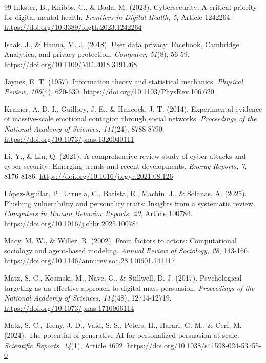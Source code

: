 \documentclass[11pt,a4paper]{article}
\newcommand{\doiurl}[1]{\href{https://doi.org/#1}{https://doi.org/#1}}
\begin{document}
\begin{thebibliography}{99}
Inkster, B., Knibbs, C., \& Bada, M. (2023). Cybersecurity: A critical priority for digital mental
health. \textit{Frontiers in Digital Health, 5}, Article 1242264.
\doiurl{10.3389/fdgth.2023.1242264}

Isaak, J., \& Hanna, M. J. (2018). User data privacy: Facebook, Cambridge Analytica, and privacy
protection. \textit{Computer, 51}(8), 56-59. \doiurl{10.1109/MC.2018.3191268}

Jaynes, E. T. (1957). Information theory and statistical mechanics. \textit{Physical Review,
106}(4), 620-630. \doiurl{10.1103/PhysRev.106.620}

Kramer, A. D. I., Guillory, J. E., \& Hancock, J. T. (2014). Experimental evidence of
massive-scale emotional contagion through social networks. \textit{Proceedings of the National
Academy of Sciences, 111}(24), 8788-8790. \doiurl{10.1073/pnas.1320040111}

Li, Y., \& Liu, Q. (2021). A comprehensive review study of cyber-attacks and cyber security:
Emerging trends and recent developments. \textit{Energy Reports, 7}, 8176-8186.
\doiurl{10.1016/j.egyr.2021.08.126}

L\'opez-Aguilar, P., Urruela, C., Batista, E., Machin, J., \& Solanas, A. (2025). Phishing
vulnerability and personality traits: Insights from a systematic review. \textit{Computers in Human
Behavior Reports, 20}, Article 100784. \doiurl{10.1016/j.chbr.2025.100784}

Macy, M. W., \& Willer, R. (2002). From factors to actors: Computational sociology and agent-based
modeling. \textit{Annual Review of Sociology, 28}, 143-166.
\doiurl{10.1146/annurev.soc.28.110601.141117}

Matz, S. C., Kosinski, M., Nave, G., \& Stillwell, D. J. (2017). Psychological targeting as an
effective approach to digital mass persuasion. \textit{Proceedings of the National Academy of
Sciences, 114}(48), 12714-12719. \doiurl{10.1073/pnas.1710966114}

Matz, S. C., Teeny, J. D., Vaid, S. S., Peters, H., Harari, G. M., \& Cerf, M. (2024). The
potential of generative AI for personalized persuasion at scale. \textit{Scientific Reports,
14}(1), Article 4692. \doiurl{10.1038/s41598-024-53755-0}


\end{thebibliography}
\end{document}
